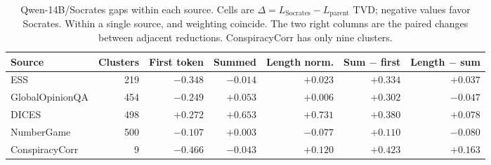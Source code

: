 \begin{table}[t]
\centering
\small
\setlength{\tabcolsep}{4pt}
\begin{tabular}{lrrrrrr}
\toprule
Source & Clusters & First token & Summed & Length norm. &
Sum $-$ first & Length $-$ sum \\
\midrule
ESS & 219 & $-0.348$ & $-0.014$ & $+0.023$ & $+0.334$ & $+0.037$ \\
GlobalOpinionQA & 454 & $-0.249$ & $+0.053$ & $+0.006$ & $+0.302$ & $-0.047$ \\
DICES & 498 & $+0.272$ & $+0.653$ & $+0.731$ & $+0.380$ & $+0.078$ \\
NumberGame & 500 & $-0.107$ & $+0.003$ & $-0.077$ & $+0.110$ & $-0.080$ \\
ConspiracyCorr & 9 & $-0.466$ & $-0.043$ & $+0.120$ & $+0.423$ & $+0.163$ \\
\bottomrule
\end{tabular}
\caption{Qwen-14B/Socrates gaps within each source. Cells are
$\Delta=L_{\mathrm{Socrates}}-L_{\mathrm{parent}}$ TVD; negative values favor
Socrates. Within a single source, \ES{} and \PC{} weighting coincide. The two
right columns are the paired changes between adjacent reductions.
ConspiracyCorr has only nine clusters.}
\label{tab:qwen14-source-gaps}
\end{table}
